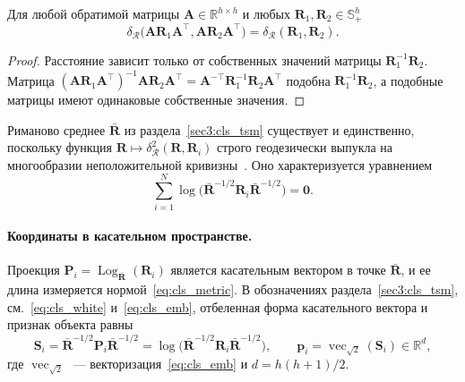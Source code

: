 \begin{lemma}\label{lem:cls_inv}
Для любой обратимой матрицы $\mathbf{A} \in \mathbb{R}^{h \times h}$ и любых $\mathbf{R}_1, \mathbf{R}_2 \in \mathbb{S}_{+}^{h}$
\begin{equation*}\delta_{\mathcal{R}}\big(\mathbf{A}\mathbf{R}_1\mathbf{A}^{\top}, \mathbf{A}\mathbf{R}_2\mathbf{A}^{\top}\big) = \delta_{\mathcal{R}}(\mathbf{R}_1, \mathbf{R}_2).
\end{equation*}
\end{lemma}
\begin{proof}
Расстояние зависит только от собственных значений матрицы $\mathbf{R}_1^{-1}\mathbf{R}_2$. Матрица $(\mathbf{A}\mathbf{R}_1\mathbf{A}^{\top})^{-1}\mathbf{A}\mathbf{R}_2\mathbf{A}^{\top} = \mathbf{A}^{-\top}\mathbf{R}_1^{-1}\mathbf{R}_2\mathbf{A}^{\top}$ подобна $\mathbf{R}_1^{-1}\mathbf{R}_2$, а подобные матрицы имеют одинаковые собственные значения.
\end{proof}

Риманово среднее $\bar{\mathbf{R}}$ из раздела~\ref{sec3:cls_tsm} существует и единственно, поскольку функция $\mathbf{R} \mapsto \delta_{\mathcal{R}}^2(\mathbf{R}, \mathbf{R}_i)$ строго геодезически выпукла на многообразии неположительной кривизны~\cite{bhatia2007positive, moakher2005differential}. Оно характеризуется уравнением
\begin{equation}\label{eq:cls_karcher}
\sum_{i=1}^{N} \log\big( \bar{\mathbf{R}}^{-1/2} \mathbf{R}_i \bar{\mathbf{R}}^{-1/2} \big) = \mathbf{0}.
\end{equation}

\paragraph{Координаты в касательном пространстве.} Проекция $\mathbf{P}_i = \operatorname{Log}_{\bar{\mathbf{R}}}(\mathbf{R}_i)$ является касательным вектором в точке $\bar{\mathbf{R}}$, и ее длина измеряется нормой~\eqref{eq:cls_metric}. В обозначениях раздела~\ref{sec3:cls_tsm}, см.~\eqref{eq:cls_white} и~\eqref{eq:cls_emb}, отбеленная форма касательного вектора и признак объекта равны
\begin{equation}\label{eq:cls_feat}
\mathbf{S}_i = \bar{\mathbf{R}}^{-1/2} \mathbf{P}_i \bar{\mathbf{R}}^{-1/2} = \log\big( \bar{\mathbf{R}}^{-1/2} \mathbf{R}_i \bar{\mathbf{R}}^{-1/2} \big),
\qquad
\mathbf{p}_i = \operatorname{vec}_{\sqrt{2}}(\mathbf{S}_i) \in \mathbb{R}^{d},
\end{equation}
где $\operatorname{vec}_{\sqrt{2}}$~--- векторизация~\eqref{eq:cls_emb} и $d = h(h+1)/2$.

